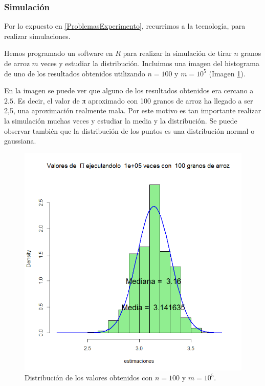 \subsubsection{Simulación}

Por lo expuesto en \ref{ProblemasExperimento}, recurrimos a la tecnología, para realizar simulaciones.

Hemos programado un software en $R$ para realizar la simulación de tirar $n$ granos de arroz $m$ veces y estudiar la distribución.
%
Incluimos una imagen del histograma de uno de los resultados obtenidos utilizando $n=100$ y $m=10^5$ (Imagen \ref{imgpidist}). 

En la imagen se puede ver que alguno de los resultados obtenidos era cercano a $2.5$.
%
Es decir, el valor de π aproximado con 100 granos de arroz ha llegado a ser 2,5, una aproximación realmente mala.
%
Por este motivo es tan importante realizar la simulación muchas veces y estudiar la media y la distribución.
%
Se puede observar también que la distribución de los puntos es una distribución normal o gaussiana.

\begin{figure}[hbtp]
\centering
\includegraphics[scale=0.5]{img/piimagen.png}
\caption{Distribución de los valores obtenidos con $n=100$ y $m=10^5$.}
\label{imgpidist}
\end{figure}

